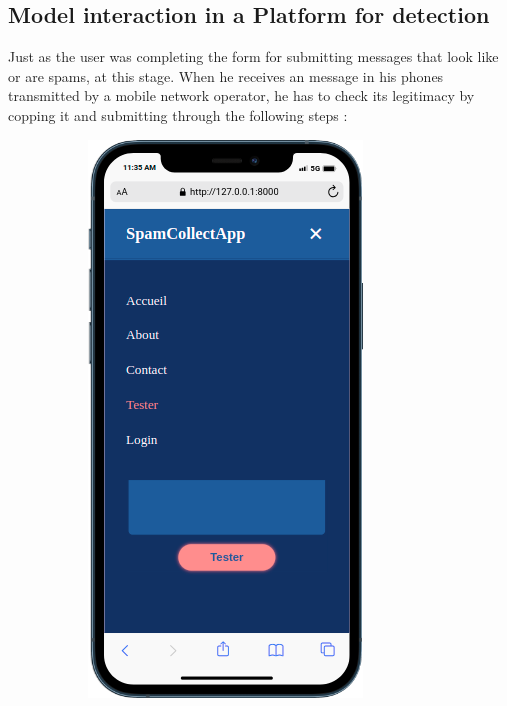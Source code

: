\documentclass[12pt,a4paper, oneside]{book}
\begin{document}
\subsection{Model interaction in a Platform for detection}
Just as the user was completing the form for submitting messages that look like or are spams, at  this stage. When he receives an message in his phones transmitted by a mobile network operator, he has to check its legitimacy by copping it and submitting through the following steps :
\begin{figure}[h]
	\centering
	\begin{subfigure}{3.5cm}
		\centering
		\includegraphics[width=1\linewidth]{CollectImages/mobileSpamTest.png}

\end{subfigure}
\end{figure}
\end{document}
